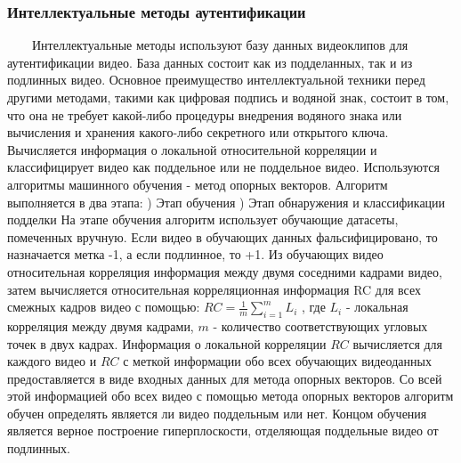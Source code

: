 \documentclass[12pt]{article}
\begin{document}
    \subsubsection{Интеллектуальные методы аутентификации}
        $\qquad$Интеллектуальные методы используют базу данных видеоклипов для аутентификации видео. База данных состоит как из подделанных, так и из подлинных видео. Основное преимущество интеллектуальной техники перед другими методами, такими как цифровая подпись и водяной знак, состоит в том, что она не требует какой-либо процедуры внедрения водяного знака или вычисления и хранения какого-либо секретного или открытого ключа.
        \newline
        Вычисляется информация о локальной относительной корреляции и классифицирует видео как поддельное или не поддельное видео. Используются алгоритмы машинного обучения - метод опорных векторов.
        \newline
        Алгоритм выполняется в два этапа:
        )      Этап обучения
        )      Этап обнаружения и классификации подделки
        \newline
        На этапе обучения алгоритм использует обучающие датасеты, помеченных вручную. Если видео в обучающих данных фальсифицировано, то назначается метка -1, а если подлинное, то +1. Из обучающих видео относительная корреляция информация между двумя соседними кадрами видео, затем вычисляется относительная корреляционная информация RC для всех смежных кадров видео с помощью: 
        $RC = \frac{1}{m}\displaystyle\sum_{i=1}^{m} L_i $ , где $L_i $ - локальная корреляция между двумя кадрами, $ m$ - количество соответствующих угловых точек в двух кадрах.  Информация о локальной корреляции $RC$ вычисляется для каждого видео и $RC$ с меткой информации обо всех обучающих видеоданных предоставляется в виде входных данных для метода опорных векторов. Со всей этой информацией обо всех видео с помощью метода опорных векторов алгоритм обучен определять является ли видео поддельным или нет.
        Концом обучения является верное построение гиперплоскости, отделяющая поддельные видео от подлинных.
\end{document}

